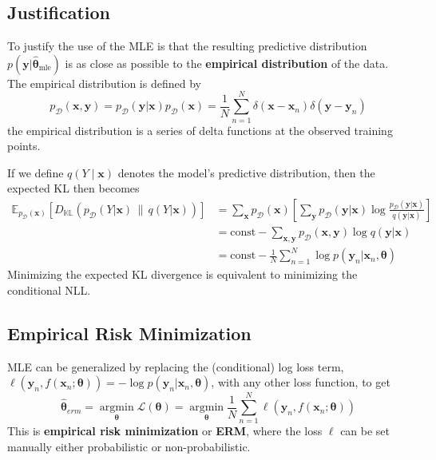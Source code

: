 \documentclass[11pt]{article}
\begin{document}
\subsection*{Justification}
To justify the use of the MLE is that the resulting predictive distribution $p(\boldsymbol{y}|\hat{\boldsymbol{\theta}}_{\text{mle}})$ is as close as possible to the \textbf{empirical distribution} of the data. The empirical distribution is defined by
\[
p_{\mathcal{D}}(\boldsymbol{x}, \boldsymbol{y}) = p_{\mathcal{D}}(\boldsymbol{y}|\boldsymbol{x}) p_{\mathcal{D}}(\boldsymbol{x}) = \frac{1}{N} \sum_{n=1}^{N} \delta(\boldsymbol{x} - \boldsymbol{x}_n) \delta(\boldsymbol{y} - \boldsymbol{y}_n)
\]
the empirical distribution is a series of delta functions at the observed training points.

If we define $q(Y \mid \boldsymbol{x})$ denotes the model's predictive distribution, then the expected KL then becomes
\[
\begin{aligned}
\mathbb{E}_{p_{\mathcal{D}}(\boldsymbol{x})} \left[ D_{\mathbb{KL}} \left( p_{\mathcal{D}}(Y|\boldsymbol{x}) \, \| \, q(Y|\boldsymbol{x}) \right) \right] &= \sum_{\boldsymbol{x}} p_{\mathcal{D}}(\boldsymbol{x}) \left[ \sum_{\boldsymbol{y}} p_{\mathcal{D}}(\boldsymbol{y}|\boldsymbol{x}) \log \frac{p_{\mathcal{D}}(\boldsymbol{y}|\boldsymbol{x})}{q(\boldsymbol{y}|\boldsymbol{x})} \right] \\
&= \text{const} - \sum_{\boldsymbol{x}, \boldsymbol{y}} p_{\mathcal{D}}(\boldsymbol{x}, \boldsymbol{y}) \log q(\boldsymbol{y}|\boldsymbol{x}) \\
&= \text{const} - \frac{1}{N} \sum_{n=1}^{N} \log p(\boldsymbol{y}_n | \boldsymbol{x}_n, \boldsymbol{\theta})
\end{aligned}
\]
Minimizing the expected KL divergence is equivalent to minimizing the conditional NLL.

\subsection{Empirical Risk Minimization}
MLE can be generalized by replacing the (conditional) log loss term, $\ell(\boldsymbol{y}_n, f(\boldsymbol{x}_n ; \boldsymbol{\theta})) = -\log p(\boldsymbol{y}_n | \boldsymbol{x}_n, \boldsymbol{\theta})$, with any other loss function, to get
\[
\hat{\boldsymbol{\theta}}_{erm} = \operatorname*{argmin}_{\boldsymbol{\theta}} \mathcal{L}(\boldsymbol{\theta}) = \operatorname*{argmin}_{\boldsymbol{\theta}} \frac{1}{N} \sum_{n=1}^{N} \ell(\boldsymbol{y}_n, f(\boldsymbol{x}_n ; \boldsymbol{\theta}))
\]
This is \textbf{empirical risk minimization} or \textbf{ERM}, where the loss $\ell$ can be set manually either probabilistic or non-probabilistic.
\end{document}
